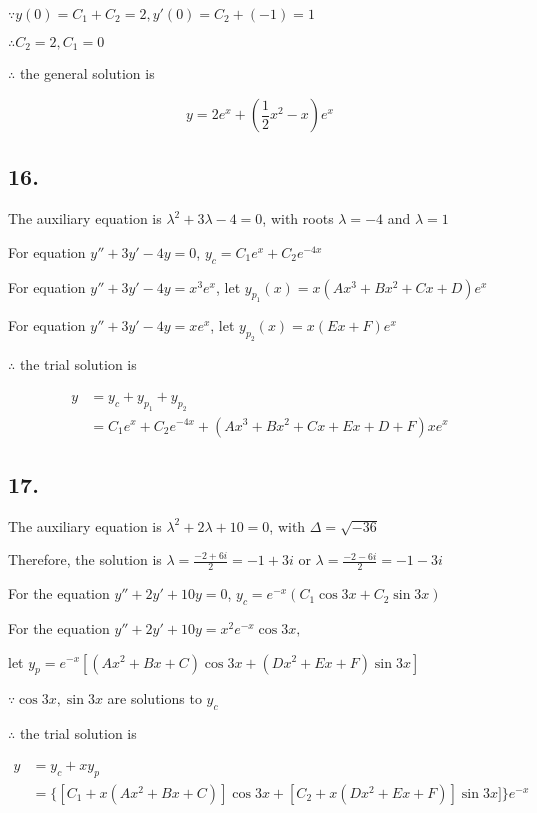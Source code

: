 \documentclass{article}
\begin{document}
  $\because y(0) = C_1 + C_2 = 2, y'(0) = C_2 + (-1) = 1$

  $\therefore C_2 = 2, C_1 = 0$

  $\therefore$ the general solution is

  $$y = 2e^x + (\frac{1}{2} x^2 - x)e^x$$

  \subsection*{16. }

  The auxiliary equation is $\lambda^2 + 3\lambda - 4 = 0$, with roots $\lambda = -4$ and $\lambda = 1$

  For equation $y'' + 3y' -4y = 0$, $y_c = C_1 e^x + C_2e^{-4x}$

  For equation $y'' + 3y' - 4y = x^3e^x$, let $y_{p_1}(x) = x(Ax^3 + Bx^2 + Cx + D)e^x$

  For equation $y'' + 3y' - 4y = xe^x$, let $y_{p_2}(x) = x(Ex + F)e^x$

  $\therefore$ the trial solution is

  $$\begin{aligned}
    y &= y_c + y_{p_1} + y_{p_2} \\
      &= C_1e^x + C_2e^{-4x} + (Ax^3 + Bx^2 + Cx + Ex + D + F)xe^x
  \end{aligned}
  $$

  \subsection*{17. }

  The auxiliary equation is $\lambda^2 + 2\lambda + 10 = 0$, with $\Delta = \sqrt{-36}$

  Therefore, the solution is $\lambda = \frac{-2 + 6i}{2} = -1 + 3i$ or $\lambda = \frac{-2 - 6i}{2} = -1 - 3i$

  For the equation $y'' + 2y' + 10y = 0$, $y_c = e^{-x}(C_1 \cos 3x + C_2 \sin 3x)$

  For the equation $y'' + 2y' + 10y = x^2 e^{-x} \cos 3x,$

  let $y_p = e^{-x} [(Ax^2 + Bx + C) \cos 3x + (Dx^2 + Ex + F) \sin 3x]$

  $\because \cos 3x, \sin 3x$ are solutions to $y_c$

  $\therefore$ the trial solution is

  $$\begin{aligned}
    y &= y_c + x y_p \\
      &= \{[C_1 + x(Ax^2 + Bx + C)] \cos 3x + [C_2 + x(Dx^2 + Ex + F)] \sin 3x] \}e^{-x}
  \end{aligned}
  $$
\end{document}
